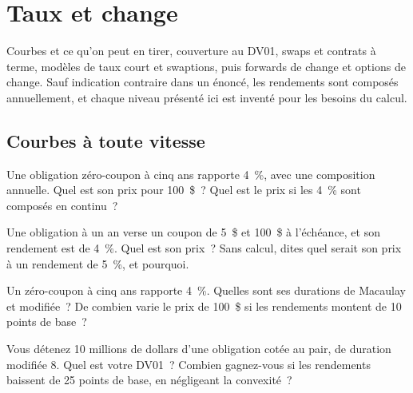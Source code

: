 \chapter{Taux et change}\label{ch:iv2:rates-and-fx}

\begin{ivtrains}
Courbes et ce qu'on peut en tirer, couverture au DV01, swaps et contrats à terme, modèles de taux court et swaptions, puis forwards de change et options de change. Sauf indication contraire dans un énoncé, les rendements sont composés annuellement, et chaque niveau présenté ici est inventé pour les besoins du calcul.
\end{ivtrains}

\section{Courbes à toute vitesse}

\begin{question}\label{iq:iv2:rates-and-fx:1}
Une obligation zéro-coupon à cinq ans rapporte 4~\%, avec une composition annuelle. Quel est son prix pour 100~\$~? Quel est le prix si les 4~\% sont composés en continu~?
\end{question}

\begin{question}\label{iq:iv2:rates-and-fx:2}
Une obligation à un an verse un coupon de 5~\$ et 100~\$ à l'échéance, et son rendement est de 4~\%. Quel est son prix~? Sans calcul, dites quel serait son prix à un rendement de 5~\%, et pourquoi.
\end{question}

\begin{question}\label{iq:iv2:rates-and-fx:3}
Un zéro-coupon à cinq ans rapporte 4~\%. Quelles sont ses durations de Macaulay et modifiée~? De combien varie le prix de 100~\$ si les rendements montent de 10 points de base~?
\end{question}

\begin{question}\label{iq:iv2:rates-and-fx:4}
Vous détenez 10 millions de dollars d'une obligation cotée au pair, de duration modifiée 8. Quel est votre DV01~? Combien gagnez-vous si les rendements baissent de 25 points de base, en négligeant la convexité~?
\end{question}

